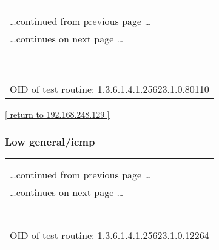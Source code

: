 \documentclass{article}
\begin{document}
\begin{longtable}{|p{}|}
\hline
\rowcolor{openvas_note}{\color{white}{Low (CVSS: 0.0) }}\\
\rowcolor{openvas_note}{\color{white}{NVT: wapiti (NASL wrapper)}}\\
\hline
\endfirsthead
\hfill\ldots continued from previous page \ldots \\
\hline
\endhead
\hline
\ldots continues on next page \ldots \\
\endfoot
\hline
\endlastfoot
\\
\rowcolor{white}{\verb=Here is the wapiti report:=}\\
\rowcolor{white}{\verb=Vulnerabilities report -- Wapiti=}\\
\rowcolor{white}{\verb=  http://wapiti.sourceforge.net/=}\\
\rowcolor{white}{\verb=This report has been generated by Wapiti Web Application Scanner=}\\
\rowcolor{white}{\verb=--- End of report ---=}\\
\rowcolor{white}{\verb==}\\
\rowcolor{white}{\verb==}\\
\\
OID of test routine: 1.3.6.1.4.1.25623.1.0.80110\\
\end{longtable}

\begin{footnotesize}\hyperref[host:192.168.248.129]{[ return to 192.168.248.129 ]}\end{footnotesize}
\subsubsection{Low general/icmp}
\label{port:192.168.248.129 general/icmp Low}

\begin{longtable}{|p{}|}
\hline
\rowcolor{openvas_note}{\color{white}{Low (CVSS: 0.0) }}\\
\rowcolor{openvas_note}{\color{white}{NVT: Record route}}\\
\hline
\endfirsthead
\hfill\ldots continued from previous page \ldots \\
\hline
\endhead
\hline
\ldots continues on next page \ldots \\
\endfoot
\hline
\endlastfoot
\\
\rowcolor{white}{\verb=Here is the route recorded between 192.168.248.132 and 192.168.248.129 :=}\\
\rowcolor{white}{\verb=192.168.248.129.=}\\
\rowcolor{white}{\verb=192.168.248.129.=}\\
\rowcolor{white}{\verb==}\\
\rowcolor{white}{\verb==}\\
\\
OID of test routine: 1.3.6.1.4.1.25623.1.0.12264\\
\end{longtable}
\end{document}
